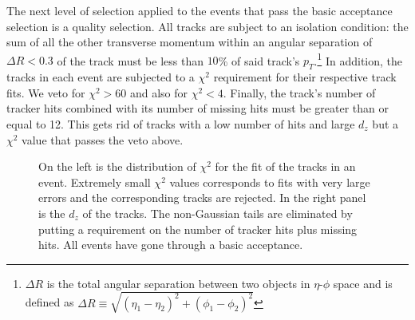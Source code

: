 \documentclass[a4paper,12pt]{article}
\begin{document}
        The next level of selection applied to the events that pass the basic
        acceptance selection is a quality selection. All tracks are subject to
        an isolation condition: the sum of all the other transverse momentum
        within an angular separation of $\Delta R < 0.3$ of the track must be
        less than $10$\% of said track's $p_{T}$.\footnote{$\Delta R$ is the
        total angular separation between two objects in $\eta$-$\phi$ space and
        is defined as $\Delta R \equiv \sqrt{(\eta_1 - \eta_2)^2 + (\phi_1 -
        \phi_2)^2}$} In addition, the tracks in each event are subjected to a
        $\chi^{2}$ requirement for their respective track fits. We veto for
        $\chi^{2} > 60$ and also for $\chi^{2} < 4$. Finally, the track's number
        of tracker hits combined with its number of missing hits must be greater
        than or equal to 12. This gets rid of tracks with a low number of hits
        and large $d_z$ but a $\chi^2$ value that passes the veto above.

        \begin{figure}[ht]%
            \centering
            \caption{On the left is the distribution of $\chi^2$ for the fit of
            the tracks in an event. Extremely small $\chi^2$ values corresponds
            to fits with very large errors and the corresponding tracks are
            rejected. In the right panel is the $d_z$ of the tracks. The
            non-Gaussian tails are eliminated by putting a requirement on the
            number of tracker hits plus missing hits. All events have gone
            through a basic acceptance.}
            \label{fig:chi2}
        \end{figure}
\end{document}

